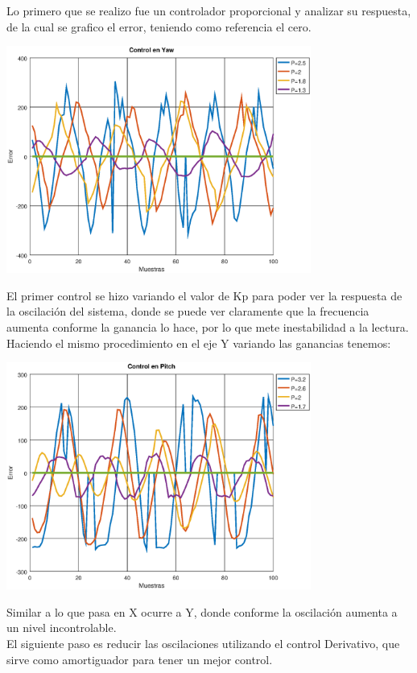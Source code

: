 Lo primero que se realizo fue un controlador proporcional y analizar su respuesta, de la cual se grafico el error, teniendo como
referencia el cero.
\begin{center}
	\includegraphics[width=0.75\textwidth]{Contenido/Cuerpo/Capitulo5/Fig8.eps}
	\label{Fig4}
\end{center}
El primer control se hizo variando el valor de Kp para poder ver la respuesta de la oscilación del sistema, donde se puede ver claramente que la 
frecuencia aumenta conforme la ganancia lo hace, por lo que mete inestabilidad a la lectura.\\
Haciendo el mismo procedimiento en el eje Y variando las ganancias tenemos:
\begin{center}
	\includegraphics[width=0.75\textwidth]{Contenido/Cuerpo/Capitulo5/Fig9.eps}
	\label{Fig4}
\end{center}
Similar a lo que pasa en X ocurre a Y, donde conforme la oscilación aumenta a un nivel incontrolable.\\
El siguiente paso es reducir las oscilaciones utilizando el control Derivativo, que sirve como amortiguador para tener un mejor control.
